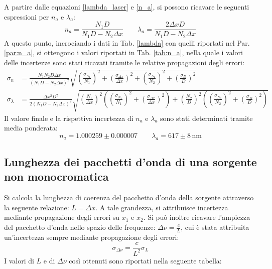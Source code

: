 \documentclass[]{article}
\let\oldsubsection\subsection%
\renewcommand{\subsection}{%
	\renewcommand{\theequation}{\thesubsection.\arabic{equation}}%
	\oldsubsection}%
\begin{document}
A partire dalle equazioni \ref{lambda_laser} e \ref{n_a}, si possono ricavare le seguenti espressioni per $n_a$ e $\lambda_a$:
\begin{equation}
    \label{rifrazione}
    n_a = \frac{N_1 D}{N_1 D - N_2 \Delta x} \qquad
    \lambda_a = \frac{2\Delta x D}{N_1 D - N_2 \Delta x}
\end{equation}
A questo punto, incrociando i dati in Tab. \ref{lambda} con quelli riportati nel Par. \ref{par:n_a}, si ottengono i valori riportati in Tab. \ref{tab:n_a}, nella quale i valori delle incertezze sono stati ricavati tramite le relative propagazioni degli errori:
\begin{align}
    \label{rifrazione-err}
    \sigma_n &= \frac{N_1 N_2 D \Delta x}{\left(N_1 D - N_2 \Delta x\right)^2} \sqrt{\left(\frac{\sigma_{N_1}}{N_1}\right)^2 + \left(\frac{\sigma_{\Delta x}}{\Delta x}\right)^2 + \left(\frac{\sigma_{N_2}}{N_2}\right)^2 + \left(\frac{\sigma_{D}}{D}\right)^2} \\
    \sigma_{\lambda} &= \frac{\Delta x^2 D^2}{2\left(N_1 D - N_2 \Delta x\right)^2} \sqrt{\left(\frac{N_1}{\Delta x}\right)^2\left(\left(\frac{\sigma_{N_1}}{N_1}\right)^2 + \left(\frac{\sigma_{\Delta x}}{\Delta x}\right)^2\right) + \left(\frac{N_2}{D}\right)^2\left(\left(\frac{\sigma_{N_2}}{N_2}\right)^2 + \left(\frac{\sigma_{D}}{D}\right)^2\right)}
\end{align}
Il valore finale e la rispettiva incertezza di $n_a$ e $\lambda_a$ sono stati determinati tramite media ponderata:
\begin{equation}
    \label{n_a-lambda}
    n_a = 1.000259 \pm 0.000007 \qquad
    \lambda_a = 617 \pm 8 \, \text{nm}
\end{equation}

\subsection{Lunghezza dei pacchetti d'onda di una sorgente non monocromatica}
Si calcola la lunghezza di coerenza del pacchetto d'onda della sorgente attraverso la seguente relazione: $L=\Delta x$. A tale grandezza, si attribuisce incertezza mediante propagazione degli errori su $x_1$ e $x_2$. Si può inoltre ricavare l'ampiezza del pacchetto d'onda nello spazio delle frequenze: $\Delta \nu = \frac{c}{L}$, cui è stata attribuita un'incertezza sempre mediante propagazione degli errori:
\begin{equation}
    \label{sigma-nu}
    \sigma_{\Delta \nu} = \frac{c}{L^2} \sigma_L
\end{equation}
I valori di $L$ e di $\Delta \nu$ così ottenuti sono riportati nella seguente tabella:
\end{document}
